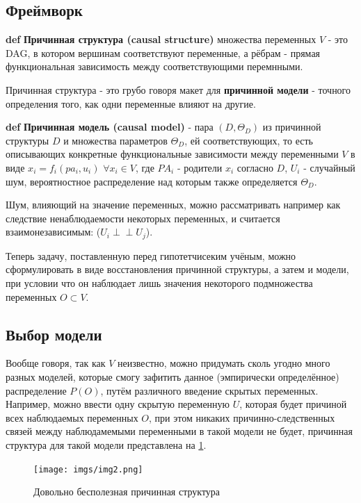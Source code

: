 \documentclass[fleqn]{article}
\newcommand{\independent}{\perp \!\!\! \perp}
\def\define#1{\textbf{def} \textbf{#1}}
\begin{document}
\subsection*{Фреймворк}

\define{Причинная структура (causal structure)} множества переменных $V$ - это DAG, в котором вершинам соответствуют переменные, а рёбрам - прямая функциональная зависимость между соответствующими перемнными.

Причинная структура - это грубо говоря макет для \textbf{причинной модели} - точного определения того, как одни переменные влияют на другие.

\define{Причинная модель (causal model)}  - пара $(D, \Theta_D)$ из причинной структуры $D$ и множества параметров $\Theta_D$, ей соответствующих, то есть описывающих конкретные функциональные зависимости между переменными $V$ в виде $x_i = f_i(pa_i, u_i)$ $\forall x_i \in V$, где $PA_i$ - родители $x_i$ согласно $D$, $U_i$ - случайный шум, вероятностное распределение над которым также определяется $\Theta_D$.

Шум, влияющий на значение переменных, можно рассматривать например как следствие ненаблюдаемости некоторых переменных, и считается взаимонезависимым: ($U_i \independent U_j$).

Теперь задачу, поставленную перед гипотетчисеким учёным, можно сформулировать в виде восстановления причинной структуры, а затем и модели, при условии что он наблюдает лишь значения некоторого подмножества переменных $O \subset V$.

\subsection*{Выбор модели}

Вообще говоря, так как $V$ неизвестно, можно придумать сколь угодно много разных моделей, которые смогу зафитить данное (эмпирически определённое) распределение $P(O)$, путём различного введение скрытых переменных. Например, можно ввести одну скрытую переменную $U$, которая будет причиной всех наблюдаемых переменных $O$, при этом никаких причинно-следственных связей между наблюдамемыми переменными в такой модели не будет, причинная структура для такой модели представлена на \ref{fig:useless_model}.

\begin{figure}[h]
	\begin{center}
		\texttt{[image: imgs/img2.png]}
	\end{center}
	\caption{Довольно бесполезная причинная структура}
	\label{fig:useless_model}
\end{figure}
\end{document}
